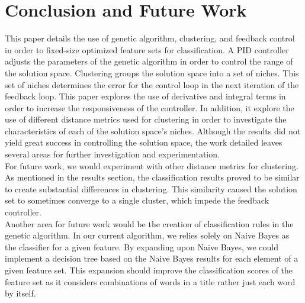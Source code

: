 \documentclass{sig-alternate}
\begin{document}
\section{Conclusion and Future Work}
This paper details the use of genetic algorithm, clustering, and feedback control in order to fixed-size optimized feature sets for classification. A PID controller adjusts the parameters of the genetic algorithm in order to control the range of the solution space. Clustering groups the solution space into a set of niches. This set of niches determines the error for the control loop in the next iteration of the feedback loop. This paper explores the use of derivative and integral terms in order to increase the responsiveness of the controller. In addition, it explore the use of different distance metrics used for clustering in order to investigate the characteristics of each of the solution space's niches. Although the results did not yield great success in controlling the solution space, the work detailed leaves several areas for further investigation and experimentation.\\
\indent For future work, we would experiment with other distance metrics for clustering. As mentioned in the results section, the classification results proved to be similar to create substantial differences in clustering. This similarity caused the solution set to sometimes converge to a single cluster, which impede the feedback controller.\\
\indent Another area for future work would be the creation of classification rules in the genetic algorithm. In our current algorithm, we relies solely on Naive Bayes as the classifier for a given feature. By expanding upon Naive Bayes, we could implement a decision tree based on the Naive Bayes results for each element of a given feature set. This expansion should improve the classification scores of the feature set as it considers combinations of words in a title rather just each word by itself.



\end{document}
